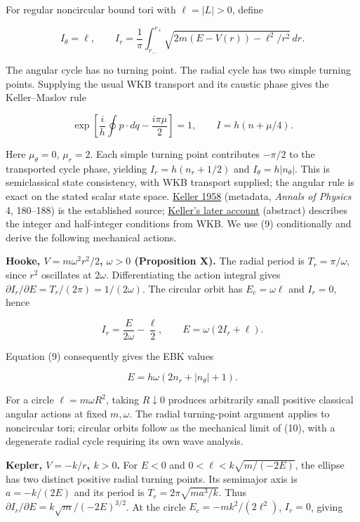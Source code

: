 \documentclass[11pt,a4paper]{article}
\begin{document}
For regular noncircular bound tori with \(\ell=|L|>0\), define

\[
I_\theta=\ell,\qquad
I_r=\frac1\pi\int_{r_-}^{r_+}
\sqrt{2m(E-V(r))-\ell^2/r^2}\,dr.
\]

The angular cycle has no turning point. The radial cycle has two simple
turning points. Supplying the usual WKB transport and its caustic phase
gives the Keller--Maslov rule

\[
\exp\left[\frac{i}{h}\oint p\cdot dq-\frac{i\pi\mu}{2}\right]=1,
\qquad I=h(n+\mu/4). \tag{9}
\]

Here \(\mu_\theta=0\), \(\mu_r=2\). Each simple turning point
contributes \(-\pi/2\) to the transported cycle phase, yielding
\(I_r=h(n_r+1/2)\) and \(I_\theta=h|n_\theta|\). This is semiclassical
state consistency, with WKB transport supplied; the angular rule is
exact on the stated scalar state space.
\href{https://doi.org/10.1016/0003-4916(58)90032-0}{Keller 1958}
(metadata, \emph{Annals of Physics} 4, 180--188) is the established
source; \href{https://doi.org/10.1137/1027139}{Keller's later account}
(abstract) describes the integer and half-integer conditions from WKB.
We use (9) conditionally and derive the following mechanical actions.

\textbf{Hooke, \(V=m\omega^2r^2/2\), \(\omega>0\) (Proposition X).} The
radial period is \(T_r=\pi/\omega\), since \(r^2\) oscillates at
\(2\omega\). Differentiating the action integral gives
\(\partial I_r/\partial E=T_r/(2\pi)=1/(2\omega)\). The circular orbit
has \(E_c=\omega\ell\) and \(I_r=0\), hence

\[
I_r=\frac{E}{2\omega}-\frac\ell2,
\qquad E=\omega(2I_r+\ell). \tag{10}
\]

Equation (9) consequently gives the EBK values

\[E=h\omega(2n_r+|n_\theta|+1).\]

For a circle \(\ell=m\omega R^2\), taking \(R\downarrow0\) produces
arbitrarily small positive classical angular actions at fixed
\(m,\omega\). The radial turning-point argument applies to noncircular
tori; circular orbits follow as the mechanical limit of (10), with a
degenerate radial cycle requiring its own wave analysis.

\textbf{Kepler, \(V=-k/r\), \(k>0\).} For \(E<0\) and
\(0<\ell<k\sqrt{m/(-2E)}\), the ellipse has two distinct positive radial
turning points. Its semimajor axis is \(a=-k/(2E)\) and its period is
\(T_r=2\pi\sqrt{ma^3/k}\). Thus
\(\partial I_r/\partial E=k\sqrt m/(-2E)^{3/2}\). At the circle
\(E_c=-mk^2/(2\ell^2)\), \(I_r=0\), giving
\end{document}
